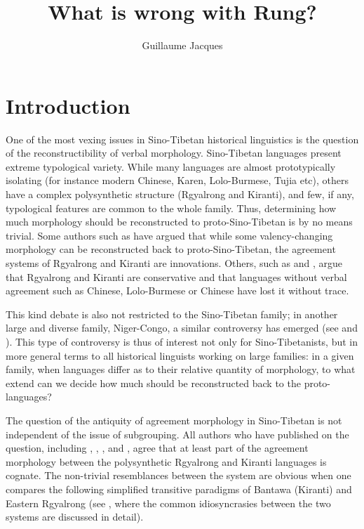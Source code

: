 \documentclass[oldfontcommands,oneside,a4paper,11pt]{article}
\begin{document}
 


\title{What is wrong with Rung?}
\author{Guillaume Jacques}
\maketitle

\section{Introduction}
One of the most vexing issues in Sino-Tibetan historical linguistics is the question of the reconstructibility of verbal morphology. Sino-Tibetan languages present extreme  typological variety. While many  languages are almost prototypically isolating (for instance modern Chinese, Karen, Lolo-Burmese, Tujia etc), others  have a complex polysynthetic structure (Rgyalrong and Kiranti), and few, if any, typological features are common to the whole family. Thus, determining   how much morphology should be reconstructed to proto-Sino-Tibetan is by no means trivial. Some authors such as  \citet{lapolla03} have argued that while some valency-changing morphology can be reconstructed back to proto-Sino-Tibetan, the agreement systems of Rgyalrong and Kiranti are innovations. Others, such as  \citet{driem93agreement}  and \citet{delancey10agreement}, argue that Rgyalrong and Kiranti are conservative and that languages without verbal agreement such as Chinese, Lolo-Burmese or Chinese have lost it without trace.
 
This kind debate is also not restricted to the Sino-Tibetan family; in another large and diverse family, Niger-Congo, a similar controversy has emerged (see  \citealt{guldeman08macrosudan} and  \citealt{hyman11macrosudan}).  This type of controversy is thus of   interest not only for Sino-Tibetanists, but in more general terms to all historical linguists working on large families: in a given family,  when languages differ as to their relative quantity of morphology, to what extend can we decide how much should be reconstructed back to the proto-languages?

The question of the antiquity of agreement morphology in Sino-Tibetan is not independent of the issue of subgrouping. All authors who have published on the question, including  \citet{ebert90rung}, \citet{driem93agreement}, \citet{lapolla03}, \citet{delancey10agreement} and \citet{jacques12agreement}, agree that at least part of the agreement morphology between the polysynthetic Rgyalrong and Kiranti languages is cognate. The non-trivial resemblances between the system are obvious when one compares  the following simplified transitive paradigms of Bantawa (Kiranti) and Eastern Rgyalrong (see \citealt{jacques12agreement}, where the common idiosyncrasies between the two systems are discussed in detail). 
\end{document}
